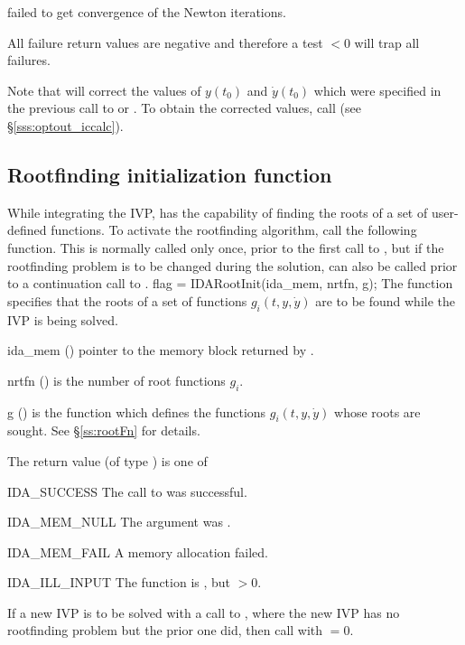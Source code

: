 {{\begin{args}
  \item[\Id{IDA\_CONV\_FAIL}]
     failed to get convergence of the Newton iterations.

  \end{args}
}
{
  All failure return values are negative and therefore a test  $< 0$
  will trap all  failures.

  Note that  will correct the values of $y(t_0)$ and $\dot{y}(t_0)$
  which were specified in the previous call to  or .
  To obtain the corrected values, call  (see \S\ref{sss:optout_iccalc}).
}


\subsection{Rootfinding initialization function}\label{ss:idarootinit}

While integrating the IVP, {\idas} has the capability of finding the
roots of a set of user-defined functions. To activate the rootfinding
algorithm, call the following function.  This is normally called only
once, prior to the first call to , but if the rootfinding
problem is to be changed during the solution,  can also
be called prior to a continuation call to .
{
  flag = IDARootInit(ida\_mem, nrtfn, g);
}
{
  The function  specifies that the roots of a set of
  functions $g_i(t,y,\dot{y})$ are to be found while the IVP is being solved.
}
{
  \begin{args}
  \item[ida\_mem] ()
    pointer to the {\idas} memory block returned by .
  \item[nrtfn] ()
    is the number of root functions $g_i$.
  \item[g] ()
    is the {\CC} function which defines the  functions $g_i(t,y,\dot{y})$
    whose roots are sought. See \S\ref{ss:rootFn} for details.
 \end{args}
}
{
  The return value  (of type ) is one of
  \begin{args}
  \item[IDA\_SUCCESS]
    The call to  was successful.
  \item[IDA\_MEM\_NULL]
    The  argument was .
  \item[IDA\_MEM\_FAIL]
    A memory allocation failed.
  \item[IDA\_ILL\_INPUT]
    The function  is , but $>0$.
  \end{args}
}
{
  If a new IVP is to be solved with a call to , where the new
  IVP has no rootfinding problem but the prior one did, then call
   with $=0$.
}


}
